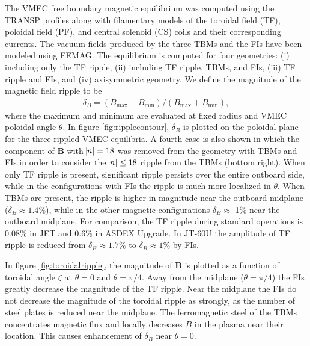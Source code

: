 \documentclass[aip, pop, preprint]{revtex4-1}
\begin{document}
\FloatBarrier

The VMEC free boundary \cite{Hirshman1986a} magnetic equilibrium was computed using the TRANSP profiles along with filamentary models of the toroidal field (TF), poloidal field (PF), and central solenoid (CS) coils and their corresponding currents. The vacuum fields produced by the three TBMs and the FIs have been modeled using FEMAG.\cite{Shinohara2009} The equilibrium is computed for four geometries: (i) including only the TF ripple, (ii) including TF ripple, TBMs, and FIs, (iii) TF ripple and FIs, and (iv) axisymmetric geometry. We define the magnitude of the magnetic field ripple to be
\begin{gather}
\delta_B = (B_{\mathrm{max}}-B_{\mathrm{min}})/(B_{\mathrm{max}} + B_{\mathrm{min}}), 
\end{gather}
where the maximum and minimum are evaluated at fixed radius and VMEC poloidal angle $\theta$. In figure \ref{fig:ripplecontour}, $\delta_B$ is plotted on the poloidal plane for the three rippled VMEC equilibria. A fourth case is also shown in which the component of $\bm{B}$ with $\abs{ n } = 18$ was removed from the geometry with TBMs and FIs in order to consider the $\abs{ n } \leq 18$ ripple from the TBMs (bottom right). When only TF ripple is present, significant ripple persists over the entire outboard side, while in the configurations with FIs the ripple is much more localized in $\theta$. When TBMs are present, the ripple is higher in magnitude near the outboard midplane ($\delta_B \approx 1.4\%$), while in the other magnetic configurations $\delta_B \approx$ 1\% near the outboard midplane. For comparison, the TF ripple during standard operations is $0.08\%$ in JET \cite{DeVries2008b} and $0.6\%$ in ASDEX Upgrade.\cite{Martitsch2016} In JT-60U the amplitude of TF ripple is reduced from $\delta_B \approx 1.7\%$ to $\delta_B \approx 1\%$ by FIs.\cite{Urano2007}

In figure \ref{fig:toroidalripple}, the magnitude of $\bm{B}$ is plotted as a function of toroidal angle $\zeta$ at $\theta = 0$ and $\theta = \pi/4$. Away from the midplane ($\theta = \pi/4$) the FIs greatly decrease the magnitude of the TF ripple. Near the midplane the FIs do not decrease the magnitude of the toroidal ripple as strongly, as the number of steel plates is reduced near the midplane.\cite{Shinohara2009} The ferromagnetic steel of the TBMs concentrates magnetic flux and locally decreases $B$ in the plasma near their location. This causes enhancement of $\delta_B$  near $\theta = 0$. 
\FloatBarrier
\end{document}
